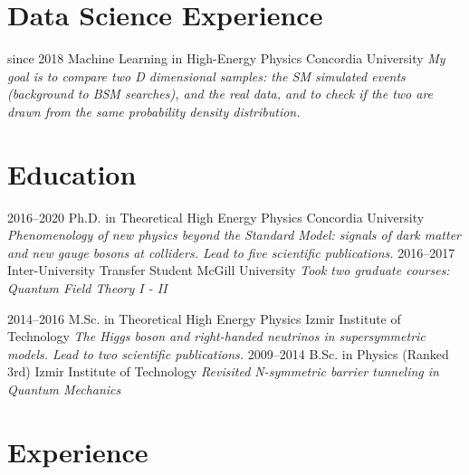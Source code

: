 \documentclass[]{friggeri-cv}
\begin{document}
\section{Data Science Experience}

\begin{entrylist}
	\entry
	{since 2018}
	{Machine Learning in High-Energy Physics}
	{Concordia University}
   {\emph{My goal is to compare two D dimensional samples: the SM simulated events (background to BSM searches), and the real data, and to check if the two are drawn from the same probability density distribution.}}

\end{entrylist}

\section{Education}
\begin{entrylist}
  \entry
    {2016--2020}
    {Ph.D. in Theoretical High Energy Physics}
    {Concordia University}
    {\emph{Phenomenology of new physics beyond the Standard Model: signals of dark matter and new gauge bosons at colliders. Lead to five scientific publications.}}
   \entry
   {2016--2017}
   {Inter-University Transfer Student}
   {McGill University}
   {\emph{Took two graduate courses: Quantum Field Theory I -  II}}
   
  \entry
    {2014–2016}
    {M.Sc. in Theoretical High Energy Physics}
    {Izmir Institute of Technology}
    {\emph{The Higgs boson and right-handed neutrinos in supersymmetric models. Lead to two scientific publications.}}
  \entry
    {2009–2014}
    {B.Sc. in Physics (Ranked 3rd)}
    {Izmir Institute of Technology}
    {\emph{Revisited N-symmetric barrier tunneling in Quantum Mechanics}}
    

\end{entrylist}

\section{Experience}
\end{document}
